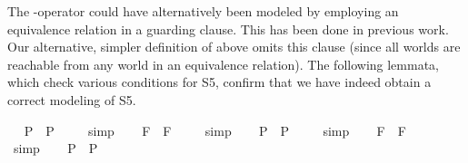 \begin{isabellebody}
\begin{isamarkuptext}
The \isa{{\isasymbox}}-operator could have alternatively been modeled by employing an equivalence relation  in a 
  guarding clause. This has been done in previous work. Our alternative, simpler definition of 
  \isa{{\isasymbox}} above omits
  this clause (since all worlds are reachable from any world in an equivalence relation). The 
  following lemmata, which check various conditions for S5, confirm that we have indeed 
  obtain a correct modeling of S5.%
\end{isamarkuptext}%
\isamarkuptrue%
\ \isamarkupfalse%
\ {\isachardoublequoteopen}{\isacharbrackleft}\isactrlbold {\isasymbox}{\isasymphi}\isactrlsup P\ \isactrlbold {\isasymrightarrow}\ {\isasymphi}\isactrlsup P{\isacharbrackright}\ {\isacharequal}\ {\isasymtop}{\isachardoublequoteclose}%
\isadelimproof
\ %
\endisadelimproof
%
\isatagproof
{}\isamarkupfalse%
\ simp\ \isamarkupfalse%
%
\endisatagproof
{\isafoldproof}%
%
\isadelimproof
%
\endisadelimproof
\isanewline
\ \isamarkupfalse%
\ {\isachardoublequoteopen}{\isacharbrackleft}\isactrlbold {\isasymbox}{\isasymphi}\isactrlsup F\ \isactrlbold {\isasymrightarrow}\ {\isasymphi}\isactrlsup F{\isacharbrackright}\ {\isacharequal}\ {\isasymtop}{\isachardoublequoteclose}%
\isadelimproof
\ %
\endisadelimproof
%
\isatagproof
{}\isamarkupfalse%
\ simp\ \isamarkupfalse%
%
\endisatagproof
{\isafoldproof}%
%
\isadelimproof
%
\endisadelimproof
\isanewline
\ \isamarkupfalse%
\ {\isachardoublequoteopen}{\isacharbrackleft}{\isasymphi}\isactrlsup P\ \isactrlbold {\isasymrightarrow}\ \isactrlbold {\isasymbox}\isactrlbold {\isasymdiamond}{\isasymphi}\isactrlsup P{\isacharbrackright}\ {\isacharequal}\ {\isasymtop}{\isachardoublequoteclose}%
\isadelimproof
\ %
\endisadelimproof
%
\isatagproof
{}\isamarkupfalse%
\ simp\ \isamarkupfalse%
%
\endisatagproof
{\isafoldproof}%
%
\isadelimproof
%
\endisadelimproof
\isanewline
\ \isamarkupfalse%
\ {\isachardoublequoteopen}{\isacharbrackleft}{\isasymphi}\isactrlsup F\ \isactrlbold {\isasymrightarrow}\ \isactrlbold {\isasymbox}\isactrlbold {\isasymdiamond}{\isasymphi}\isactrlsup F{\isacharbrackright}\ {\isacharequal}\ {\isasymtop}{\isachardoublequoteclose}%
\isadelimproof
\ %
\endisadelimproof
%
\isatagproof
{}\isamarkupfalse%
\ simp\ \isamarkupfalse%
%
\endisatagproof
{\isafoldproof}%
%
\isadelimproof
%
\endisadelimproof
\isanewline
\ \isamarkupfalse%
\ {\isachardoublequoteopen}{\isacharbrackleft}\isactrlbold {\isasymbox}{\isasymphi}\isactrlsup P\ \isactrlbold {\isasymrightarrow}\ \isactrlbold {\isasymdiamond}{\isasymphi}\isactrlsup P{\isacharbrackright}\ {\isacharequal}\ {\isasymtop}{\isachardoublequoteclose}%

\end{isabellebody}
